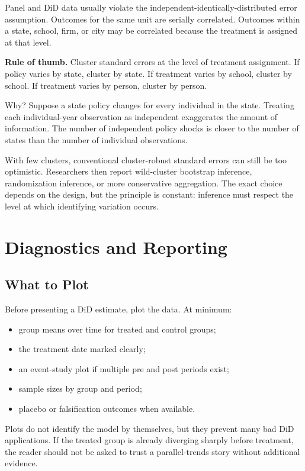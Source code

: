 Panel and DiD data usually violate the independent-identically-distributed error
assumption. Outcomes for the same unit are serially correlated. Outcomes within a
state, school, firm, or city may be correlated because the treatment is assigned
at that level.

\begin{boxF}
\textbf{Rule of thumb.} Cluster standard errors at the level of treatment
assignment. If policy varies by state, cluster by state. If treatment varies by
school, cluster by school. If treatment varies by person, cluster by person.
\end{boxF}

Why? Suppose a state policy changes for every individual in the state. Treating
each individual-year observation as independent exaggerates the amount of
information. The number of independent policy shocks is closer to the number of
states than the number of individual observations.

With few clusters, conventional cluster-robust standard errors can still be too
optimistic. Researchers then report wild-cluster bootstrap inference,
randomization inference, or more conservative aggregation. The exact choice
depends on the design, but the principle is constant: inference must respect the
level at which identifying variation occurs.

\section{Diagnostics and Reporting}

\subsection{What to Plot}

Before presenting a DiD estimate, plot the data. At minimum:
\begin{itemize}
    \item group means over time for treated and control groups;
    \item the treatment date marked clearly;
    \item an event-study plot if multiple pre and post periods exist;
    \item sample sizes by group and period;
    \item placebo or falsification outcomes when available.
\end{itemize}

Plots do not identify the model by themselves, but they prevent many bad DiD
applications. If the treated group is already diverging sharply before
treatment, the reader should not be asked to trust a parallel-trends story
without additional evidence.

